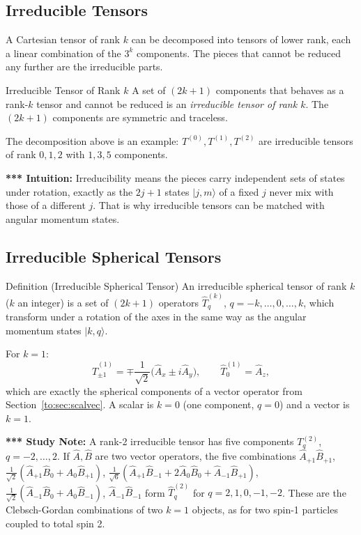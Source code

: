 \documentclass[11pt,a4paper]{article}
\begin{document}
\subsection{Irreducible Tensors}
A Cartesian tensor of rank $k$ can be decomposed into tensors of lower rank, each a linear combination of the $3^k$ components. The pieces that cannot be reduced any further are the irreducible parts.

\begin{thm}{Irreducible Tensor of Rank $k$}
A set of $(2k+1)$ components that behaves as a rank-$k$ tensor and cannot be reduced is an \emph{irreducible tensor of rank $k$}. The $(2k+1)$ components are symmetric and traceless.
\end{thm}

The decomposition above is an example: $T^{(0)},T^{(1)},T^{(2)}$ are irreducible tensors of rank $0,1,2$ with $1,3,5$ components.

\textbf{*** Intuition:} Irreducibility means the pieces carry independent sets of states under rotation, exactly as the $2j+1$ states $|j,m\rangle$ of a fixed $j$ never mix with those of a different $j$. That is why irreducible tensors can be matched with angular momentum states.

\subsection{Irreducible Spherical Tensors}
\begin{thm}{Definition (Irreducible Spherical Tensor)}
An irreducible spherical tensor of rank $k$ ($k$ an integer) is a set of $(2k+1)$ operators $\hat T^{(k)}_q$, $q=-k,\dots,0,\dots,k$, which transform under a rotation of the axes in the same way as the angular momentum states $|k,q\rangle$.
\end{thm}

For $k=1$:
\[
\hat T^{(1)}_{\pm1}=\mp\frac1{\sqrt2}\big(\hat A_x\pm i\hat A_y\big),\qquad\hat T^{(1)}_0=\hat A_z ,
\]
which are exactly the spherical components of a vector operator from Section~\ref{to:sec:scalvec}. A scalar is $k=0$ (one component, $q=0$) and a vector is $k=1$.

\textbf{*** Study Note:} A rank-2 irreducible tensor has five components $T^{(2)}_q$, $q=-2,\dots,2$. If $\hat A,\hat B$ are two vector operators, the five combinations $\hat A_{+1}\hat B_{+1}$, $\tfrac1{\sqrt2}(\hat A_{+1}\hat B_0+\hat A_0\hat B_{+1})$, $\tfrac1{\sqrt6}(\hat A_{+1}\hat B_{-1}+2\hat A_0\hat B_0+\hat A_{-1}\hat B_{+1})$, $\tfrac1{\sqrt2}(\hat A_{-1}\hat B_0+\hat A_0\hat B_{-1})$, $\hat A_{-1}\hat B_{-1}$ form $\hat T^{(2)}_{q}$ for $q=2,1,0,-1,-2$. These are the Clebsch-Gordan combinations of two $k=1$ objects, as for two spin-1 particles coupled to total spin 2.
\end{document}
